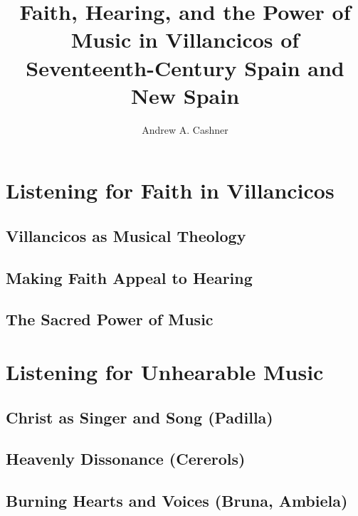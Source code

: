 \documentclass{vcbook}
\begin{document}
\begin{titlingpage}
\title{Faith, Hearing, and the Power of Music in Villancicos of Seventeenth-Century Spain and New Spain}
\author{Andrew A. Cashner}
\maketitle
\end{titlingpage}

\tableofcontents*

\part{Listening for Faith in Villancicos}

\chapter{Villancicos as Musical Theology}


\chapter{Making Faith Appeal to Hearing}
% 

\chapter{The Sacred Power of Music}
% 

\part{Listening for Unhearable Music}

\chapter{Christ as Singer and Song (Padilla)}
% 

\chapter{Heavenly Dissonance (Cererols)}
% 

\chapter{Burning Hearts and Voices (Bruna, Ambiela)}
% 
\end{document}

